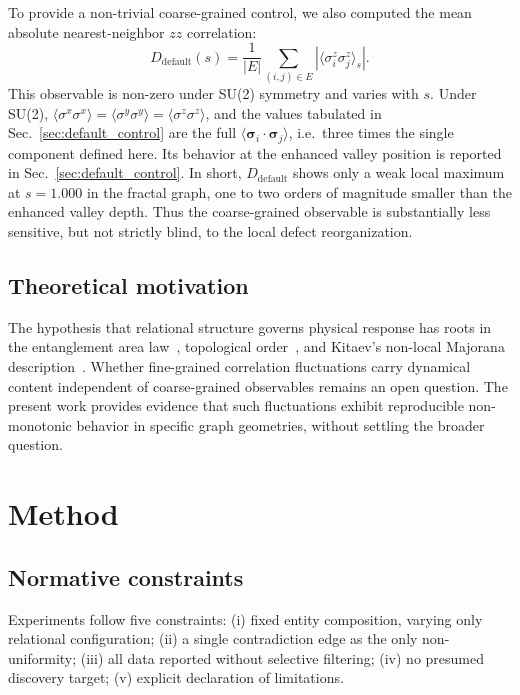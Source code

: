 \documentclass[aps,prb,reprint,superscriptaddress]{revtex4-2}
\begin{document}
To provide a non-trivial coarse-grained control, we also computed the mean absolute nearest-neighbor $zz$ correlation:
\begin{equation}
D_{\text{default}}(s)=\frac{1}{|E|}\sum_{(i,j)\in E}\left|\langle\sigma_i^z\sigma_j^z\rangle_s\right|.
\end{equation}
This observable is non-zero under SU(2) symmetry and varies with $s$. Under SU(2), $\langle\sigma^x\sigma^x\rangle=\langle\sigma^y\sigma^y\rangle=\langle\sigma^z\sigma^z\rangle$, and the values tabulated in Sec.~\ref{sec:default_control} are the full $\langle\boldsymbol{\sigma}_i\cdot\boldsymbol{\sigma}_j\rangle$, i.e.\ three times the single component defined here. Its behavior at the enhanced valley position is reported in Sec.~\ref{sec:default_control}. In short, $D_{\text{default}}$ shows only a weak local maximum at $s=1.000$ in the fractal graph, one to two orders of magnitude smaller than the enhanced valley depth. Thus the coarse-grained observable is substantially less sensitive, but not strictly blind, to the local defect reorganization.

\subsection{Theoretical motivation}

The hypothesis that relational structure governs physical response has roots in the entanglement area law~\cite{Eisert2010}, topological order~\cite{Wen2017}, and Kitaev's non-local Majorana description~\cite{Kitaev2001}. Whether fine-grained correlation fluctuations carry dynamical content independent of coarse-grained observables remains an open question. The present work provides evidence that such fluctuations exhibit reproducible non-monotonic behavior in specific graph geometries, without settling the broader question.

\section{Method}

\subsection{Normative constraints}

Experiments follow five constraints: (i) fixed entity composition, varying only relational configuration; (ii) a single contradiction edge as the only non-uniformity; (iii) all data reported without selective filtering; (iv) no presumed discovery target; (v) explicit declaration of limitations.
\end{document}

